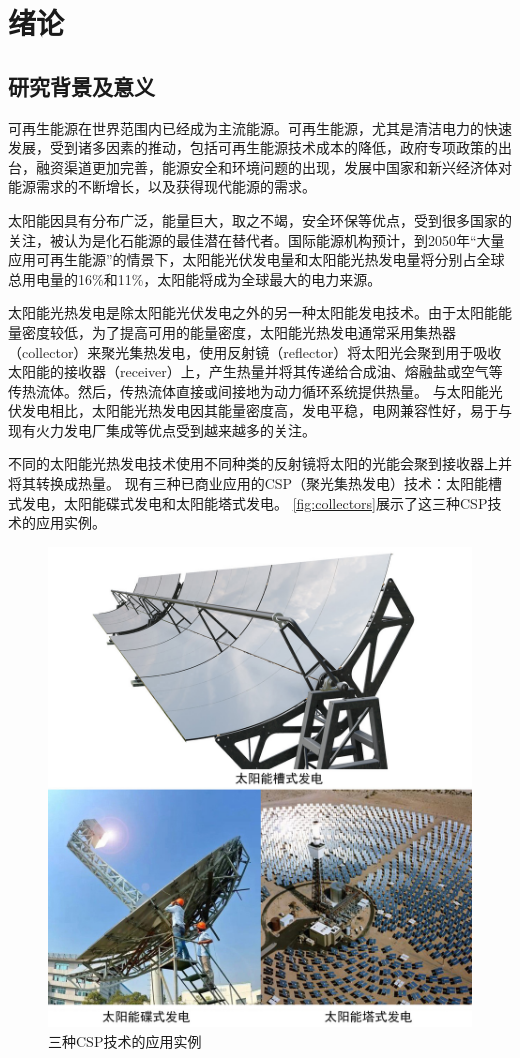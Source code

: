 \chapter{绪论}
\label{cha:Introduction}

\section{研究背景及意义}

可再生能源在世界范围内已经成为主流能源。可再生能源，尤其是清洁电力的快速发展，受到诸多因素的推动，包括可再生能源技术成本的降低，政府专项政策的出台，融资渠道更加完善，能源安全和环境问题的出现，发展中国家和新兴经济体对能源需求的不断增长，以及获得现代能源的需求。

太阳能因具有分布广泛，能量巨大，取之不竭，安全环保等优点，受到很多国家的关注，被认为是化石能源的最佳潜在替代者。国际能源机构预计，到2050年“大量应用可再生能源”的情景下，太阳能光伏发电量和太阳能光热发电量将分别占全球总用电量的16\%和11\%，太阳能将成为全球最大的电力来源\cite{IEA2014}。

太阳能光热发电是除太阳能光伏发电之外的另一种太阳能发电技术。由于太阳能能量密度较低，为了提高可用的能量密度，太阳能光热发电通常采用集热器（collector）来聚光集热发电，使用反射镜（reflector）将太阳光会聚到用于吸收太阳能的接收器（receiver）上，产生热量并将其传递给合成油、熔融盐或空气等传热流体。然后，传热流体直接或间接地为动力循环系统提供热量。
与太阳能光伏发电相比，太阳能光热发电因其能量密度高，发电平稳，电网兼容性好，易于与现有火力发电厂集成等优点受到越来越多的关注。

不同的太阳能光热发电技术使用不同种类的反射镜将太阳的光能会聚到接收器上并将其转换成热量。
现有三种已商业应用的CSP（聚光集热发电）技术：太阳能槽式发电，太阳能碟式发电和太阳能塔式发电。
\autoref{fig:collectors}展示了这三种CSP技术的应用实例。
\begin{figure}[!ht]
\centering
\includegraphics[width=.8\textwidth]{fig/Collectors}
\caption{三种CSP技术的应用实例}\label{fig:collectors}
\end{figure}

